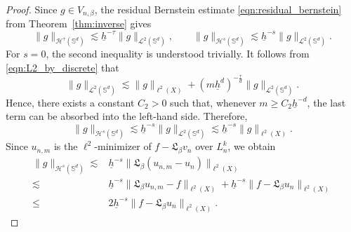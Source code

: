 \documentclass[10pt,a4paper]{amsart}
\def\SS{\mathbb{S}}
\begin{document}
\begin{proof}
\medskip
Since $g\in V_{n,\beta}$, the residual Bernstein estimate \eqref{eqn:residual_bernstein} from Theorem~\ref{thm:inverse} gives
\begin{equation}\label{eqn:residual_bernstein_used}
    \|g\|_{\mathcal H^\tau(\SS^d)}
    \lesssim\underline h^{-\tau}\|g\|_{\mathcal L^2(\SS^d)},
    \qquad
    \|g\|_{\mathcal H^s(\SS^d)}
    \lesssim\underline h^{-s}\|g\|_{\mathcal L^2(\SS^d)}.
\end{equation}
For $s=0$, the second inequality is understood trivially. It follows from \eqref{eqn:L2_by_discrete} that
\begin{equation*}
    \|g\|_{\mathcal L^2(\SS^d)}
    \lesssim\|g\|_{\ell^2(X)}
    +(m\underline h^d)^{-\frac{\tau}{d}}\|g\|_{\mathcal L^2(\SS^d)}.
\end{equation*}
Hence, there exists a constant $C_2>0$ such that, whenever $m\geq C_2\underline h^{-d}$, the last term can be absorbed into the left-hand side. Therefore,
\begin{equation}\label{eqn:residual_stability}
    \|g\|_{\mathcal H^s(\SS^d)}
    \lesssim\underline h^{-s}\|g\|_{\mathcal L^2(\SS^d)}
    \lesssim\underline h^{-s}\|g\|_{\ell^2(X)}.
\end{equation}
Since $u_{n,m}$ is the $\ell^2$-minimizer of $f-\mathfrak L_\beta v_n$ over $L_n^k$, we obtain
\begin{equation}\label{eqn:error_decom2}
    \begin{split}
        \|g\|_{\mathcal H^s(\SS^d)}
        \lesssim&\underline h^{-s}\|\mathfrak L_\beta(u_{n,m}-u_n)\|_{\ell^2(X)}\\
        \lesssim&\underline h^{-s}\|\mathfrak L_\beta u_{n,m}-f\|_{\ell^2(X)}
        +\underline h^{-s}\|f-\mathfrak L_\beta u_n\|_{\ell^2(X)}\\
        \leq&2\underline h^{-s}\|f-\mathfrak L_\beta u_n\|_{\ell^2(X)}.
    \end{split}
\end{equation}


\end{proof}
\end{document}
